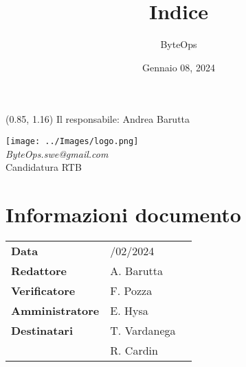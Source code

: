 \documentclass{article}
\title{\textbf{\fontsize{28}{6}\selectfont Indice}}
\author{\fontsize{14}{6}\selectfont ByteOps}
\date{Gennaio 08, 2024}
\begin{document}
\begin{textblock*}{\textwidth}(0.85\textwidth, 1.16\textheight)
    Il responsabile: Andrea Barutta
\end{textblock*}

\pagestyle{fancy}
\begin{center}
\texttt{[image: ../Images/logo.png]} \\
\vspace{0.2cm}
\textcolor[RGB]{60, 60, 60}{\textit{ByteOps.swe@gmail.com}} \\
\vspace{1cm}
\fontsize{16}{6}\selectfont Candidatura RTB \\
\vspace{0.5cm}
\end{center}

\section*{Informazioni documento}
\def\arraystretch{1.2}
\begin{tabular}{>{\raggedleft\arraybackslash}p{}|>{\raggedright\arraybackslash}p{}c}
\hline
\addlinespace
\textbf{Data} & 08/02/2024 \vspace{10pt} \\
\textbf{Redattore} & A. Barutta \vspace{10pt} \\
\textbf{Verificatore} & F. Pozza \vspace{10pt} \\
\textbf{Amministratore} & E. Hysa \vspace{10pt} \\
\textbf{Destinatari} & T. Vardanega \\ & R. Cardin \vspace{10pt} \\
\end{tabular}
\pagebreak 

\maketitle
\thispagestyle{fancy}
\tableofcontents
{}
\pagebreak

\flushleft
\end{document}
